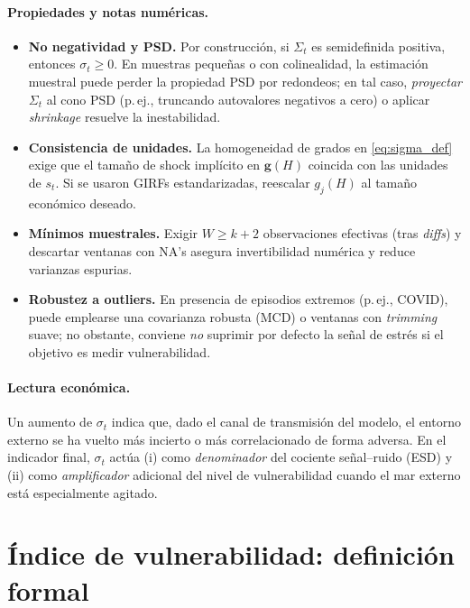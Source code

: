 \documentclass[11pt,a4paper]{article}
\newcommand{\1}{\mathbf{1}}
\newcommand{\vect}[1]{\boldsymbol{#1}}
\begin{document}
\paragraph{Propiedades y notas numéricas.}
\begin{itemize}
  \item \textbf{No negatividad y PSD.} Por construcción, si $\Sigma_t$ es semidefinida positiva, entonces $\sigma_t\ge 0$. En muestras pequeñas o con colinealidad, la estimación muestral puede perder la propiedad PSD por redondeos; en tal caso, \emph{proyectar} $\Sigma_t$ al cono PSD (p.\,ej., truncando autovalores negativos a cero) o aplicar \emph{shrinkage} resuelve la inestabilidad.
  \item \textbf{Consistencia de unidades.} La homogeneidad de grados en \eqref{eq:sigma_def} exige que el tamaño de shock implícito en $\vect{g}(H)$ coincida con las unidades de $s_t$. Si se usaron GIRFs estandarizadas, reescalar $g_j(H)$ al tamaño económico deseado.
  \item \textbf{Mínimos muestrales.} Exigir $W \ge k+2$ observaciones efectivas (tras \emph{diffs}) y descartar ventanas con NA's asegura invertibilidad numérica y reduce varianzas espurias.
  \item \textbf{Robustez a outliers.} En presencia de episodios extremos (p.\,ej., COVID), puede emplearse una covarianza robusta (MCD) o ventanas con \emph{trimming} suave; no obstante, conviene \emph{no} suprimir por defecto la señal de estrés si el objetivo es medir vulnerabilidad.
\end{itemize}

\paragraph{Lectura económica.}
Un aumento de $\sigma_t$ indica que, dado el canal de transmisión del modelo, el entorno externo se ha vuelto más incierto o más correlacionado de forma adversa. En el indicador final, $\sigma_t$ actúa (i) como \emph{denominador} del cociente señal--ruido (ESD) y (ii) como \emph{amplificador} adicional del nivel de vulnerabilidad cuando el mar externo está especialmente agitado.


\section{Índice de vulnerabilidad: definición formal}
\end{document}
